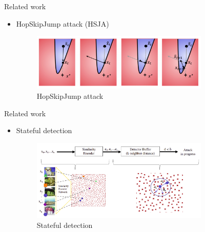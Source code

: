 \documentclass[11pt,t]{beamer}
\begin{document}
%
\begin{frame}{Related work}
\begin{itemize}
	\item HopSkipJump attack (HSJA)
	\vspace{6pt}
	\begin{figure}
	\centering
	\includegraphics[width=0.8\textwidth]{graphics/hsj_attack.png}
	\caption{HopSkipJump attack \cite{chen2020hopskipjumpattack}\label{fig:hsj_attack}}
	\footnotesize
	\flushleft
	\end{figure}
\end{itemize}
\end{frame}

\begin{frame}{Related work}
	\begin{itemize}
	\item Stateful detection
	
		\begin{figure}
		\centering
		\includegraphics[width=0.8\textwidth]{graphics/stateful_detection.png}
		\caption{Stateful detection \cite{chen2019stateful}	
		\label{fig:stateful_detection}}
		\footnotesize
		\flushleft
		\end{figure}
	\end{itemize}
\end{frame}
\end{document}
